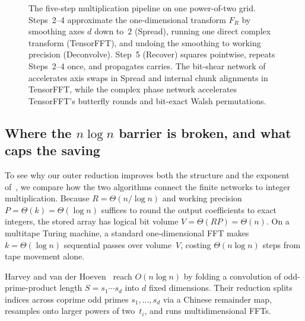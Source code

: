 \begin{figure}[t]
\caption{The five-step multiplication pipeline on one power-of-two grid. Steps~2--4 approximate the one-dimensional transform $F_R$ by smoothing axes $d$ down to~$2$ (\textsf{Spread}), running one direct complex transform (\textsf{TensorFFT}), and undoing the smoothing to working precision (\textsf{Deconvolve}). Step~5 (\textsf{Recover}) squares pointwise, repeats Steps~2--4 once, and propagates carries. The bit-shear network of~\cite{OAI26} accelerates axis swaps in \textsf{Spread} and internal chunk alignments in \textsf{TensorFFT}, while the complex phase network accelerates \textsf{TensorFFT}'s butterfly rounds and bit-exact Walsh permutations.}
\label{fig:five-steps}
\end{figure}

\subsection{Where the \texorpdfstring{$n\log n$}{n log n} barrier is broken, and what caps the saving}\label{sec:overview-barrier}

To see why our outer reduction improves both the structure and the exponent of~\cite{OAI26}, we compare how the two algorithms connect the finite networks to integer multiplication. Because $R=\Theta(n/\log n)$ and working precision $P=\Theta(k)=\Theta(\log n)$ suffices to round the output coefficients to exact integers, the stored array has logical bit volume $V=\Theta(RP)=\Theta(n)$. On a multitape Turing machine, a standard one-dimensional FFT makes $k=\Theta(\log n)$ sequential passes over volume~$V$, costing $\Theta(n\log n)$ steps from tape movement alone.

Harvey and van der Hoeven~\cite{HvdH21} reach $O(n\log n)$ by folding a convolution of odd-prime-product length $S=s_1\cdots s_d$ into $d$ fixed dimensions. Their reduction splits indices across coprime odd primes $s_1,\dots,s_d$ via a Chinese remainder map, resamples onto larger powers of two~$t_i$, and runs multidimensional FFTs.

